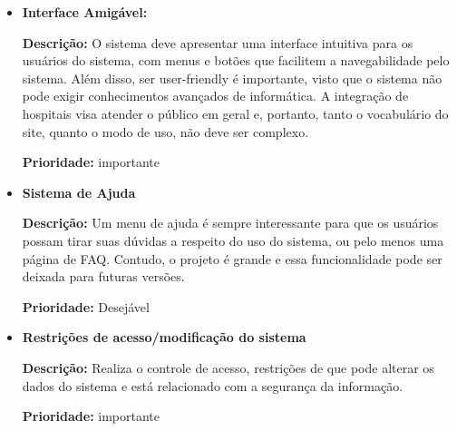 \documentclass[12pt,a4paper]{report}
\begin{document}
\begin{itemize}

\item \textbf{Interface Amigável:} 

\textbf{Descrição:} O sistema deve apresentar uma interface intuitiva para os usuários do sistema, com menus e botões que facilitem a navegabilidade pelo sistema.
Além disso, ser user-friendly é importante, visto que o sistema não pode exigir conhecimentos avançados de informática. A integração de hospitais visa atender o público em geral e, portanto, tanto o vocabulário do site, quanto o modo de uso, não deve ser complexo. 

\textbf{Prioridade:} importante


\item \textbf{Sistema de Ajuda} 

\textbf{Descrição:} Um menu de ajuda é sempre interessante para que os usuários possam tirar suas dúvidas a respeito do uso do sistema, ou pelo menos uma página de FAQ. Contudo, o projeto é grande e essa funcionalidade pode ser deixada para futuras versões. 

\textbf{Prioridade:} Desejável \newline


\item \textbf{Restrições de acesso/modificação do sistema}

\textbf{Descrição:} Realiza o controle de acesso, restrições de que pode alterar os dados do sistema e está relacionado com a segurança da informação.

\textbf{Prioridade:} importante

\end{itemize}
\end{document}
